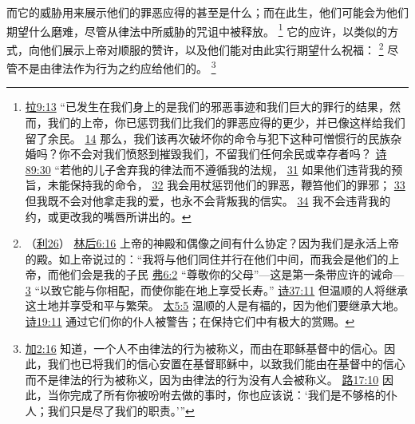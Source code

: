 \documentclass[12pt, a4paper, oneside]{ctexart}
\begin{document}
	而它的威胁用来展示他们的罪恶应得的甚至是什么；而在此生，他们可能会为他们期望什么磨难，尽管从律法中所威胁的咒诅中被释放。
	\footnote {
		\href{https://biblehub.com/ezra/9-13.htm}{拉9:13} “已发生在我们身上的是我们的邪恶事迹和我们巨大的罪行的结果，然而，我们的上帝，你已惩罚我们比我们的罪恶应得的更少，并已像这样给我们留了余民。
		\href{https://biblehub.com/ezra/9-14.htm}{14} 那么，我们该再次破坏你的命令与犯下这种可憎惯行的民族杂婚吗？你不会对我们愤怒到摧毁我们，不留我们任何余民或幸存者吗？
		\href{https://biblehub.com/psalms/89-30.htm}{诗89:30} “若他的儿子舍弃我的律法而不遵循我的法规，
		\href{https://biblehub.com/psalms/89-31.htm}{31} 如果他们违背我的预旨，未能保持我的命令，
		\href{https://biblehub.com/psalms/89-32.htm}{32} 我会用杖惩罚他们的罪恶，鞭笞他们的罪邪；
		\href{https://biblehub.com/psalms/89-33.htm}{33} 但我既不会对他拿走我的爱，也永不会背叛我的信实。
		\href{https://biblehub.com/psalms/89-34.htm}{34} 我不会违背我的约，或更改我的嘴唇所讲出的。
	}
	它的应许，以类似的方式，向他们展示上帝对顺服的赞许，以及他们能对由此实行期望什么祝福：
	\footnote {
		（\href{https://biblehub.com/niv/leviticus/26.htm}{利26}）
		\href{https://biblehub.com/2_corinthians/6-16.htm}{林后6:16} 上帝的神殿和偶像之间有什么协定？因为我们是永活上帝的殿。如上帝说过的：“我将与他们同住并行在他们中间，而我会是他们的上帝，而他们会是我的子民
		\href{https://biblehub.com/ephesians/6-2.htm}{弗6:2} “尊敬你的父母”---这是第一条带应许的诫命---
		\href{https://biblehub.com/ephesians/6-3.htm}{3} “以致它能与你相配，而使你能在地上享受长寿。”
		\href{https://biblehub.com/psalms/37-11.htm}{诗37:11} 但温顺的人将继承这土地并享受和平与繁荣。
		\href{https://biblehub.com/matthew/5-5.htm}{太5:5} 温顺的人是有福的，因为他们要继承大地。
		\href{https://biblehub.com/psalms/19-11.htm}{诗19:11} 通过它们你的仆人被警告；在保持它们中有极大的赏赐。
	}
	尽管不是由律法作为行为之约应给他们的。
	\footnote {
		\href{https://biblehub.com/galatians/2-16.htm}{加2:16} 知道，一个人不由律法的行为被称义，而由在耶稣基督中的信心。因此，我们也已将我们的信心安置在基督耶稣中，以致我们能由在基督中的信心而不是律法的行为被称义，因为由律法的行为没有人会被称义。
		\href{https://biblehub.com/luke/17-10.htm}{路17:10} 因此，当你完成了所有你被吩咐去做的事时，你也应该说：‘我们是不够格的仆人；我们只是尽了我们的职责。’”
	}
\end{document}
